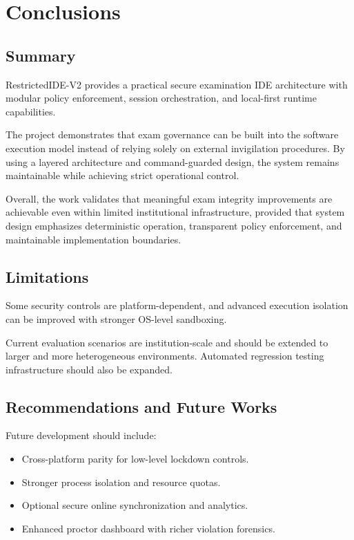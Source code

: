 \documentclass[12pt,a4paper]{report}
\begin{document}
	\chapter{Conclusions}
	
	\section{Summary}
	RestrictedIDE-V2 provides a practical secure examination IDE architecture with modular policy enforcement, session orchestration, and local-first runtime capabilities.
	
	The project demonstrates that exam governance can be built into the software execution model instead of relying solely on external invigilation procedures. By using a layered architecture and command-guarded design, the system remains maintainable while achieving strict operational control.
	
	Overall, the work validates that meaningful exam integrity improvements are achievable even within limited institutional infrastructure, provided that system design emphasizes deterministic operation, transparent policy enforcement, and maintainable implementation boundaries.
	
	\section{Limitations}
	Some security controls are platform-dependent, and advanced execution isolation can be improved with stronger OS-level sandboxing.
	
	Current evaluation scenarios are institution-scale and should be extended to larger and more heterogeneous environments. Automated regression testing infrastructure should also be expanded.
	
	\section{Recommendations and Future Works}
	Future development should include:
	\begin{itemize}
		\item Cross-platform parity for low-level lockdown controls.
		\item Stronger process isolation and resource quotas.
		\item Optional secure online synchronization and analytics.
		\item Enhanced proctor dashboard with richer violation forensics.
	\end{itemize}
	
\end{document}
